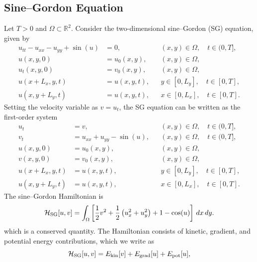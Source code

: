 \documentclass[11pt,a4paper]{article}
\theoremstyle{definition}
\theoremstyle{remark}
\numberwithin{equation}{section}
\numberwithin{figure}{section}
\numberwithin{table}{section}
\begin{document}
\subsection{Sine--Gordon Equation}
\label{subsubsec:sg_results}

Let $T>0$ and $\Omega\subset\mathbb{R}^2$. Consider the two-dimensional sine--Gordon (SG) equation, given by
\begin{equation}
\begin{aligned}
u_{tt}-u_{xx}-u_{yy}+\sin(u) &= 0,
&& (x,y)\in\Omega,\quad t\in(0,T],\\
u(x,y,0) &= u_0(x,y),
&& (x,y)\in\Omega,\\
u_t(x,y,0) &= v_0(x,y),
&& (x,y)\in\Omega,\\
u(x+L_x,y,t) &= u(x,y,t),
&& y\in[0,L_y],\quad t\in[0,T],\\
u(x,y+L_y,t) &= u(x,y,t),
&& x\in[0,L_x],\quad t\in[0,T].
\end{aligned}
\label{eq:sg_2d_equation}
\end{equation}
Setting the velocity variable as $v=u_t$, the SG equation can be written as the first-order system
\begin{equation}
\begin{aligned}
u_t &= v,
&& (x,y)\in\Omega,\quad t\in(0,T],\\
v_t &= u_{xx}+u_{yy}-\sin(u),
&& (x,y)\in\Omega,\quad t\in(0,T],\\
u(x,y,0) &= u_0(x,y),
&& (x,y)\in\Omega,\\
v(x,y,0) &= v_0(x,y),
&& (x,y)\in\Omega,\\
u(x+L_x,y,t) &= u(x,y,t),
&& y\in[0,L_y],\quad t\in[0,T],\\
u(x,y+L_y,t) &= u(x,y,t),
&& x\in[0,L_x],\quad t\in[0,T].
\end{aligned}
\label{eq:sg_2d_first_order_system}
\end{equation}
The sine--Gordon Hamiltonian is
\begin{equation}
    \mathcal H_{\rm SG}[u,v]
    =
    \int_{\Omega}
    \left[
        \frac12 v^2
        +
        \frac12\left(u_x^2+u_y^2\right)
        +
        1-\cos(u)
    \right]\,dx\,dy .
    \label{eq:sg_hamiltonian}
\end{equation}
which is a conserved quantity. 
The Hamiltonian consists of kinetic, gradient, and potential energy contributions,
which we write as
\begin{equation}
    \mathcal H_{\rm SG}[u,v]
    =
    E_{\rm kin}[v]
    +
    E_{\rm grad}[u]
    +
    E_{\rm pot}[u],
    \label{eq:sg_hamiltonian_decomposition}
\end{equation}
\end{document}
